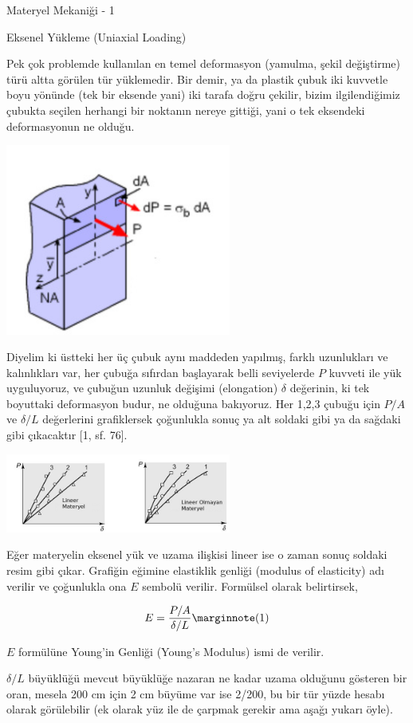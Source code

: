 \documentclass[12pt,fleqn]{article}\usepackage{../../common}
\begin{document}
Materyel Mekaniği - 1

Eksenel Yükleme (Uniaxial Loading)

Pek çok problemde kullanılan en temel deformasyon (yamulma, şekil değiştirme)
türü altta görülen tür yüklemedir. Bir demir, ya da plastik çubuk iki kuvvetle
boyu yönünde (tek bir eksende yani) iki tarafa doğru çekilir, bizim
ilgilendiğimiz çubukta seçilen herhangi bir noktanın nereye gittiği, yani o tek
eksendeki deformasyonun ne olduğu.

\includegraphics[width=20em]{phy_020_strs_00_01.jpg}

Diyelim ki üstteki her üç çubuk aynı maddeden yapılmış, farklı uzunlukları ve
kalınlıkları var, her çubuğa sıfırdan başlayarak belli seviyelerde $P$ kuvveti
ile yük uyguluyoruz, ve çubuğun uzunluk değişimi (elongation) $\delta$
değerinin, ki tek boyuttaki deformasyon budur, ne olduğuna bakıyoruz. Her 1,2,3
çubuğu için $P/A$ ve $\delta/L$ değerlerini grafiklersek çoğunlukla sonuç ya alt
soldaki gibi ya da sağdaki gibi çıkacaktır [1, sf. 76].

\includegraphics[width=20em]{phy_020_strs_00_02.jpg}

Eğer materyelin eksenel yük ve uzama ilişkisi lineer ise o zaman sonuç soldaki
resim gibi çıkar. Grafiğin eğimine elastiklik genliği (modulus of elasticity)
adı verilir ve çoğunlukla ona $E$ sembolü verilir. Formülsel olarak belirtirsek,

$$
E = \frac{P/A}{\delta / L}
\mlabel{1}
$$

$E$ formülüne Young'in Genliği (Young's Modulus) ismi de verilir. 

$\delta/L$ büyüklüğü mevcut büyüklüğe nazaran ne kadar uzama olduğunu gösteren
bir oran, mesela 200 cm için 2 cm büyüme var ise 2/200, bu bir tür yüzde hesabı
olarak görülebilir (ek olarak yüz ile de çarpmak gerekir ama aşağı yukarı öyle).
\end{document}
